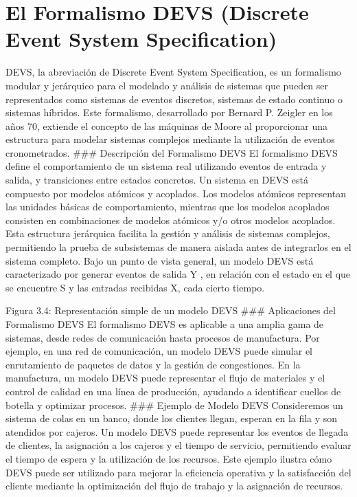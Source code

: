 \documentclass[12pt,twoside]{templates/unerthesis}
\begin{document}
\hypertarget{el-formalismo-devs-discrete-event-system-specification}{%
\section{El Formalismo DEVS (Discrete Event System Specification)}\label{el-formalismo-devs-discrete-event-system-specification}}

DEVS, la abreviación de Discrete Event System Specification, es un formalismo modular y jerárquico para el modelado y análisis de sistemas que pueden ser representados como sistemas de eventos discretos, sistemas de estado continuo o sistemas híbridos. Este formalismo, desarrollado por Bernard P. Zeigler en los años 70, extiende el concepto de las máquinas de Moore al proporcionar una estructura para modelar sistemas complejos mediante la utilización de eventos cronometrados.
\#\#\# Descripción del Formalismo DEVS
El formalismo DEVS define el comportamiento de un sistema real utilizando eventos de entrada y salida, y transiciones entre estados concretos. Un sistema en DEVS está compuesto por modelos atómicos y acoplados. Los modelos atómicos representan las unidades básicas de comportamiento, mientras que los modelos acoplados consisten en combinaciones de modelos atómicos y/o otros modelos acoplados. Esta estructura jerárquica facilita la gestión y análisis de sistemas complejos, permitiendo la prueba de subsistemas de manera aislada antes de integrarlos en el sistema completo.
Bajo un punto de vista general, un modelo DEVS está caracterizado por generar eventos de salida Y , en relación con el estado en el que se encuentre S y las entradas recibidas X, cada cierto tiempo.

Figura 3.4: Representación simple de un modelo DEVS
\#\#\# Aplicaciones del Formalismo DEVS
El formalismo DEVS es aplicable a una amplia gama de sistemas, desde redes de comunicación hasta procesos de manufactura. Por ejemplo, en una red de comunicación, un modelo DEVS puede simular el enrutamiento de paquetes de datos y la gestión de congestiones. En la manufactura, un modelo DEVS puede representar el flujo de materiales y el control de calidad en una línea de producción, ayudando a identificar cuellos de botella y optimizar procesos.
\#\#\# Ejemplo de Modelo DEVS
Consideremos un sistema de colas en un banco, donde los clientes llegan, esperan en la fila y son atendidos por cajeros. Un modelo DEVS puede representar los eventos de llegada de clientes, la asignación a los cajeros y el tiempo de servicio, permitiendo evaluar el tiempo de espera y la utilización de los recursos. Este ejemplo ilustra cómo DEVS puede ser utilizado para mejorar la eficiencia operativa y la satisfacción del cliente mediante la optimización del flujo de trabajo y la asignación de recursos.
\end{document}

